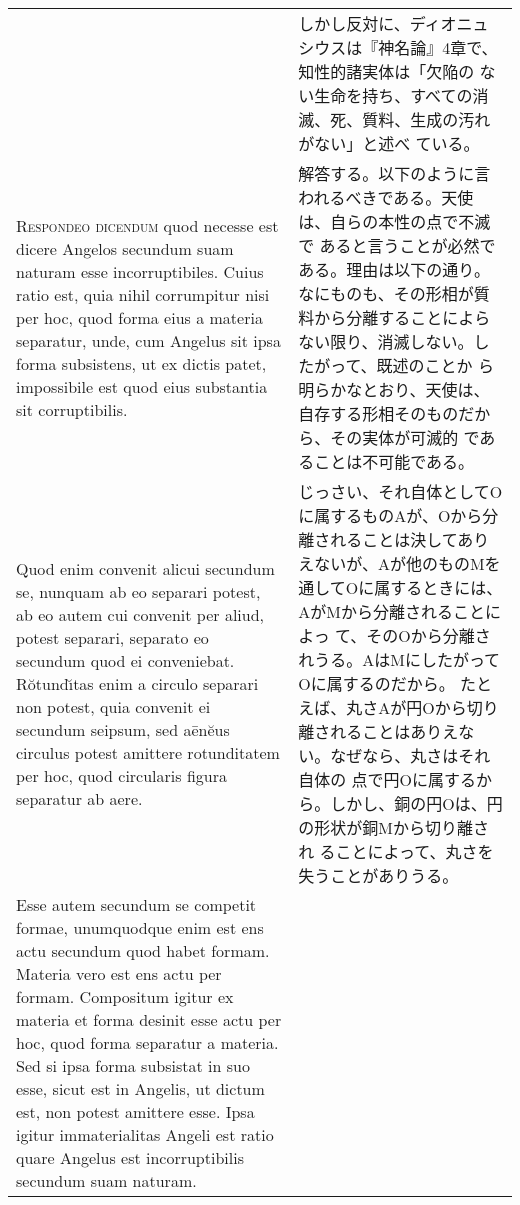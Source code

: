 \documentclass[10pt]{jsarticle} %
\begin{document}
\begin{longtable}{p{21em}p{21em}}
&
しかし反対に、ディオニュシウスは『神名論』4章で、知性的諸実体は「欠陥の
 ない生命を持ち、すべての消滅、死、質料、生成の汚れがない」と述べ
 ている。

\\


{\scshape Respondeo dicendum} quod necesse est dicere
Angelos secundum suam naturam esse incorruptibiles. Cuius ratio est,
quia nihil corrumpitur nisi per hoc, quod forma eius a materia
separatur, unde, cum Angelus sit ipsa forma subsistens, ut ex dictis
patet, impossibile est quod eius substantia sit corruptibilis. 


&

解答する。以下のように言われるべきである。天使は、自らの本性の点で不滅で
 あると言うことが必然である。理由は以下の通り。なにものも、その形相が質
 料から分離することによらない限り、消滅しない。したがって、既述のことか
 ら明らかなとおり、天使は、自存する形相そのものだから、その実体が可滅的
 であることは不可能である。


\\

Quod enim
convenit alicui secundum se, nunquam ab eo separari potest, ab eo autem
cui convenit per aliud, potest separari, separato eo secundum quod ei
conveniebat. R\u{o}tund\u{\i}tas enim a circulo separari non potest, quia
convenit ei secundum seipsum, sed a\={e}n\u{e}us circulus potest amittere
rotunditatem per hoc, quod circularis figura separatur ab aere. 

&

じっさい、それ自体としてOに属するものAが、Oから分離されることは決してあり
 えないが、Aが他のものMを通してOに属するときには、AがMから分離されることによっ
 て、そのOから分離されうる。AはMにしたがってOに属するのだから。
たとえば、丸さAが円Oから切り離されることはありえない。なぜなら、丸さはそれ自体の
 点で円Oに属するから。しかし、銅の円Oは、円の形状が銅Mから切り離され
 ることによって、丸さを失うことがありうる。

\\

Esse
autem secundum se competit formae, unumquodque enim est ens actu
secundum quod habet formam. Materia vero est ens actu per
formam. Compositum igitur ex materia et forma desinit esse actu per hoc,
quod forma separatur a materia. Sed si ipsa forma subsistat in suo esse,
sicut est in Angelis, ut dictum est, non potest amittere esse. Ipsa
igitur immaterialitas Angeli est ratio quare Angelus est incorruptibilis
secundum suam naturam. 




\end{longtable}
\end{document}
